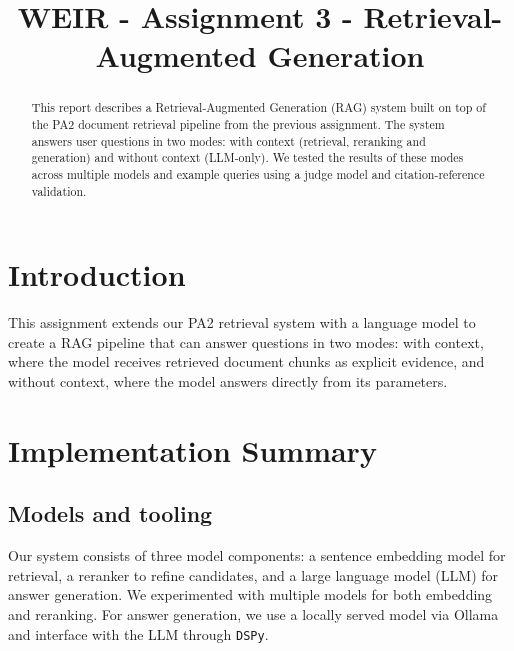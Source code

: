 \documentclass[conference]{IEEEtran}
\begin{document}
\title{WEIR - Assignment 3 - Retrieval-Augmented Generation}



\author{

}

\maketitle

\begin{abstract}
This report describes a Retrieval-Augmented Generation (RAG) system built on top of the
PA2 document retrieval pipeline from the previous assignment. The system answers user questions in two modes: with context (retrieval, reranking and generation) and without context (LLM-only). We tested the results of these modes across multiple models and example queries using a judge model and citation-reference validation.
\end{abstract}

\IEEEpeerreviewmaketitle

\section{Introduction}
This assignment extends our PA2 retrieval system with a language model to create a RAG pipeline that can answer questions in two modes: with context, where the model receives retrieved document chunks as explicit evidence, and without
context, where the model answers directly from its parameters.

\section{Implementation Summary}

\subsection{Models and tooling}
Our system consists of three model components: a sentence embedding model for retrieval, a reranker to refine candidates, and a large language model (LLM) for answer generation. We experimented with multiple models for both embedding and reranking. For answer generation, we use a locally served model via Ollama and interface with the LLM through \texttt{DSPy}.
\end{document}
